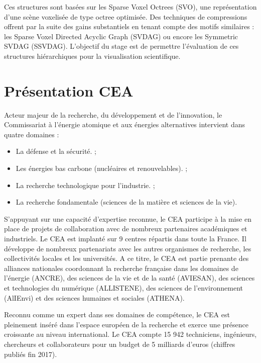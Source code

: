 \documentclass[12pt,a4paper,twoside]{article}
\begin{document}
    Ces structures
    sont basées sur les Sparse Voxel Octrees (SVO), une représentation d’une scène voxelisée de type octree optimisée.
    Des techniques de compressions offrent par la suite des gains substantiels en tenant compte des motifs similaires :
    les Sparse Voxel Directed Acyclic Graph (SVDAG) ou encore les Symmetric SVDAG (SSVDAG).
    L’objectif du stage est de permettre l’évaluation de ces structures hiérarchiques pour la visualisation scientifique.

    \newpage

    \section{Présentation CEA}                              %

    Acteur majeur de la recherche, du développement et de l'innovation, le Commissariat à l’énergie atomique et aux énergies alternatives intervient dans quatre domaines :

    \begin{itemize}[label=\textbullet]
        \item    La défense et la sécurité. ;
        \item    Les énergies bas carbone (nucléaires et renouvelables). ;
        \item    La recherche technologique pour l’industrie. ;
        \item    La recherche fondamentale (sciences de la matière et sciences de la vie).
    \end{itemize}

    S’appuyant sur une capacité d’expertise reconnue, le CEA participe à la mise en place de projets de collaboration
    avec de nombreux partenaires académiques et industriels. Le CEA est implanté sur 9 centres répartis dans toute la
    France. Il développe de nombreux partenariats avec les autres organismes de recherche, les collectivités locales
    et les universités. A ce titre, le CEA est partie prenante des alliances nationales coordonnant la recherche
    française dans les domaines de l’énergie (ANCRE), des sciences de la vie et de la santé (AVIESAN), des sciences
    et technologies du numérique (ALLISTENE), des sciences de l’environnement (AlIEnvi) et des sciences humaines et
    sociales (ATHENA).

    Reconnu comme un expert dans ses domaines de compétence, le CEA est pleinement inséré dans l'espace européen de
    la recherche et exerce une présence croissante au niveau international. Le CEA compte 15 942 techniciens,
    ingénieurs, chercheurs et collaborateurs pour un budget de 5 milliards d'euros (chiffres publiés fin 2017).
\end{document}
